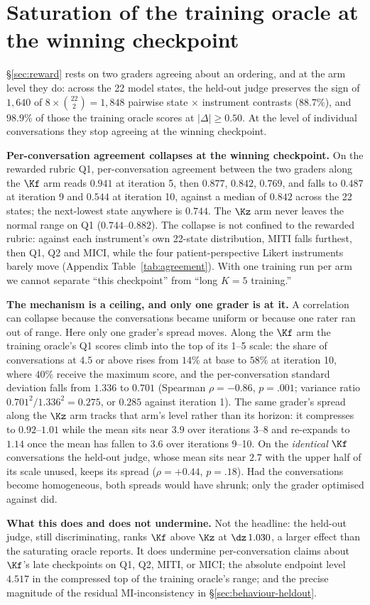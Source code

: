 \section{Saturation of the training oracle at the winning checkpoint}
\label{sec:measurement}

\S\ref{sec:reward} rests on two graders agreeing about an ordering, and at the arm level they do:
across the 22 model states, the held-out judge preserves the sign of $1{,}640$ of
$8 \times \binom{22}{2} = 1{,}848$ pairwise state $\times$ instrument contrasts ($88.7\%$), and
$98.9\%$ of those the training oracle scores at $|\Delta| \geq 0.50$. At the level of individual
conversations they stop agreeing at the winning checkpoint.

\textbf{Per-conversation agreement collapses at the winning checkpoint.} On the rewarded rubric
Q1, per-conversation agreement between the two graders along the $\Kf$ arm reads $0.941$ at
iteration 5, then $0.877$, $0.842$, $0.769$, and falls to $\mathbf{0.487}$ at iteration 9 and
$\mathbf{0.544}$ at iteration 10, against a median of $0.842$ across the 22 states; the next-lowest
state anywhere is $0.744$. The $\Kz$ arm never leaves the normal
range on Q1 ($0.744$--$0.882$). The collapse is not confined to the rewarded rubric: against each
instrument's own 22-state distribution, MITI falls furthest, then Q1, Q2 and MICI, while the four
patient-perspective Likert instruments barely move (Appendix Table~\ref{tab:agreement}). With one
training run per arm we cannot separate ``this checkpoint'' from ``long $K{=}5$ training.''

\textbf{The mechanism is a ceiling, and only one grader is at it.} A correlation can collapse
because the conversations became uniform or because one rater ran out of range. Here only one
grader's spread moves. Along the $\Kf$ arm the
training oracle's Q1 scores climb into the top of its 1--5 scale: the share of conversations at
$4.5$ or above rises from $14\%$ at base to $58\%$ at iteration 10, where $40\%$ receive the
maximum score, and the per-conversation standard deviation falls
from $1.336$ to $0.701$ (Spearman $\rho = -0.86$, $p = .001$; variance ratio
$0.701^2/1.336^2 = 0.275$, or $0.285$ against iteration 1). The same grader's spread along the
$\Kz$ arm tracks that arm's level rather than its horizon: it compresses to $0.92$--$1.01$ while
the mean sits near $3.9$ over iterations 3--8 and re-expands to $1.14$ once the mean has fallen to
$3.6$ over iterations 9--10. On the \emph{identical} $\Kf$ conversations the held-out judge, whose
mean sits near $2.7$ with the upper half of its scale unused, keeps its spread ($\rho = +0.44$,
$p = .18$). Had the conversations become homogeneous, both spreads would have shrunk; only the
grader optimised against did.

\textbf{What this does and does not undermine.} Not the headline: the held-out judge, still
discriminating, ranks $\Kf$ above $\Kz$ at $\dz\,1.030$, a larger effect than the saturating
oracle reports. It does undermine per-conversation claims about $\Kf$'s late checkpoints on Q1,
Q2, MITI, or MICI; the absolute endpoint level $4.517$ in the compressed top of the training
oracle's range; and the precise magnitude of the residual MI-inconsistency in
\S\ref{sec:behaviour-heldout}.
